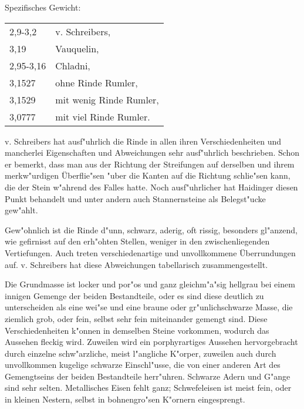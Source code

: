 \documentclass[a4paper, 11pt, oneside]{article}
\begin{document}
Spezifisches Gewicht:
\begin{table}[!ht]
    \centering\swabfamily\Large
    \begin{tabular}{l l}
        2,9-3,2 & v. Schreibers,\\
        3,19 & Vauquelin,\\
        2,95-3,16 & Chladni,\\
        3,1527 & ohne Rinde Rumler,\\
        3,1529 & mit wenig Rinde Rumler,\\
        3,0777 & mit viel Rinde Rumler.
    \end{tabular}
\end{table}

v. Schreibers hat ausf"uhrlich die Rinde in allen ihren Verschiedenheiten und mancherlei Eigenschaften und Abweichungen sehr ausf"uhrlich beschrieben. Schon er bemerkt, dass man aus der Richtung der Streifungen auf derselben und ihrem merkw"urdigen Überflie"sen "uber die Kanten auf die Richtung schlie"sen kann, die der Stein w"ahrend des Falles hatte. Noch ausf"uhrlicher hat Haidinger diesen Punkt behandelt und unter andern auch Stannernsteine als Belegst"ucke gew"ahlt.

Gew"ohnlich ist die Rinde d"unn, schwarz, aderig, oft rissig, besonders gl"anzend, wie gefirnisst auf den erh"ohten Stellen, weniger in den zwischenliegenden Vertiefungen. Auch treten verschiedenartige und unvollkommene Überrundungen auf. v. Schreibers hat diese Abweichungen tabellarisch zusammengestellt.

Die Grundmasse ist locker und por"os und ganz gleichm"a"sig hellgrau bei einem innigen Gemenge der beiden Bestandteile, oder es sind diese deutlich zu unterscheiden als eine wei"se und eine braune oder gr"unlichschwarze Masse, die ziemlich grob, oder fein, selbst sehr fein miteinander gemengt sind. Diese Verschiedenheiten k"onnen in demselben Steine vorkommen, wodurch das Aussehen fleckig wird. Zuweilen wird ein porphyrartiges Aussehen hervorgebracht durch einzelne schw"arzliche, meist l"angliche K"orper, zuweilen auch durch unvollkommen kugelige schwarze Einschl"usse, die von einer anderen Art des Gemengtseins der beiden Bestandteile herr"uhren. Schwarze Adern und G"ange sind sehr selten. Metallisches Eisen fehlt ganz; Schwefeleisen ist meist fein, oder in kleinen Nestern, selbst in bohnengro"sen K"ornern eingesprengt.
\end{document}
